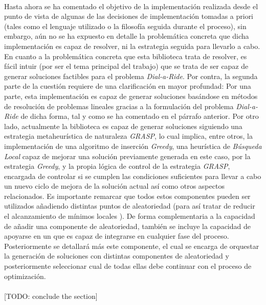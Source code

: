 \documentclass{subfiles}
\begin{document}
        \paragraph{}
        Hasta ahora se ha comentado el objetivo de la implementación realizada desde el punto de vista de algunas de las decisiones de implementación tomadas a priori (tales como el lenguaje utilizado o la filosofía seguida durante el proceso), sin embargo, aún no se ha expuesto en detalle la problemática concreta que dicha implementación es capaz de resolver, ni la estrategia seguida para llevarlo a cabo. En cuanto a la problemática concreta que esta biblioteca trata de resolver, es fácil intuir (por ser el tema principal del trabajo) que se trata de ser capaz de generar soluciones factibles para el problema \emph{Dial-a-Ride}. Por contra, la segunda parte de la cuestión requiere de una clarificación en mayor profundad: Por una parte, esta implementación es capaz de generar soluciones basándose en métodos de resolución de problemas lineales gracias a la formulación del problema \emph{Dial-a-Ride} de dicha forma, tal y como se ha comentado en el párrafo anterior. Por otro lado, actualmente la biblioteca es capaz de generar soluciones siguiendo una estrategia metaheurística de naturaleza \emph{GRASP}, lo cual implica, entre otros, la implementación de una algoritmo de inserción \emph{Greedy}, una heurística de \emph{Búsqueda Local} capaz de mejorar una solución previamente generada en este caso, por la estrategia \emph{Greedy}, y la propia lógica de control de la estrategia \emph{GRASP}, encargada de controlar si se cumplen las condiciones suficientes para llevar a cabo un nuevo ciclo de mejora de la solución actual así como otros aspectos relacionados. Es importante remarcar que todos estos componentes pueden ser utilizados añadiendo distintas puntos de aleatoriedad (para así tratar de reducir el alcanzamiento de mínimos locales ). De forma complementaria a la capacidad de añadir una componente de aleatoriedad, también se incluye la capacidad de apoyarse en un  que es capaz de integrarse en cualquier fase del proceso. Posteriormente se detallará más este componente, el cual se encarga de orquestar la generación de soluciones con distintas componentes de aleatoriedad y posteriormente seleccionar cual de todas ellas debe continuar con el proceso de optimización.

        \paragraph{}
        [TODO: conclude the section]
      
\end{document}
